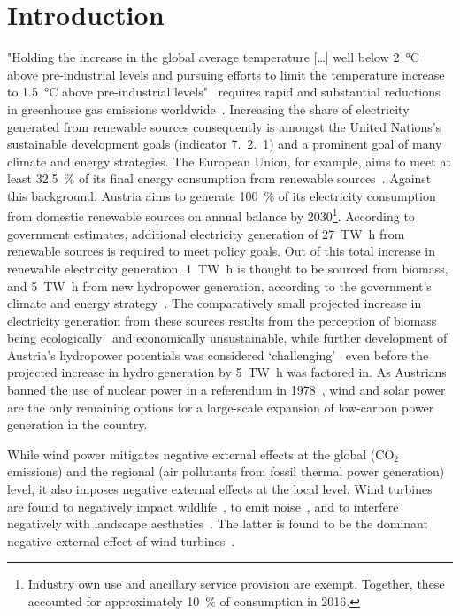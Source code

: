 \documentclass[review, 3p, times, 12pt]{elsarticle} %
\newcommand{\COO}{\ensuremath{\mathrm{CO_2}} }
\begin{document}
\section{Introduction}\label{sec:introduction}
"Holding the increase in the global average temperature [\ldots] well below \SI{2}{\celsius} above pre-industrial levels and pursuing efforts to limit the temperature increase to \SI{1.5}{\celsius} above pre-industrial levels"~\citep{UNFCCC2015} requires rapid and substantial reductions in greenhouse gas emissions worldwide~\citep{IPCC2018}.
Increasing the share of electricity generated from renewable sources consequently is amongst the United Nations's sustainable development goals (indicator 7.\ 2.\ 1) and a prominent goal of many climate and energy strategies.
The European Union, for example, aims to meet at least \SI{32.5}{\percent} of its final energy consumption from renewable sources~\citep{EU2018}.
Against this background, Austria aims to generate \SI{100}{\percent} of its electricity consumption from domestic renewable sources on annual balance by 2030\footnote{Industry own use and ancillary service provision are exempt.
Together, these accounted for approximately \SI{10}{\percent} of consumption in 2016.}.
According to government estimates, additional electricity generation of \SI{27}{\tera\watt\hour} from renewable
sources is required to meet policy goals.
Out of this total increase in renewable electricity generation, \SI{1}{\tera\watt\hour} is thought to be sourced from biomass, and \SI{5}{\tera\watt\hour} from new hydropower generation, according to the government's climate and
energy strategy~\citep{BMNT2018}.
The comparatively small projected increase in electricity generation from these sources results from the perception
of biomass being ecologically~\citep{Erb2018} and economically unsustainable, while further development of Austria's
hydropower potentials was considered `challenging'~\citep{Wagner2015} even before the projected increase in hydro
generation by \SI{5}{\tera\watt\hour} was factored in.
As Austrians banned the use of nuclear power in a referendum in 1978~\citep{Pelinka1983}, wind and solar
power are the only remaining options for a large-scale expansion of low-carbon power generation in the country.

While wind power mitigates negative external effects at the global (\COO emissions) and the regional (air pollutants
from fossil thermal power generation) level, it also imposes negative external effects at the local level.
Wind turbines are found to negatively impact wildlife~\cite{Loss2013,Voigt2015,Wang2015}, to emit
noise~\cite{Wang2015a}, and to interfere negatively with landscape aesthetics~\citep{Jones2010, Meyerhoff2010}.
The latter is found to be the dominant negative external effect of wind turbines~\cite{Mattmann2016}.
\end{document}
